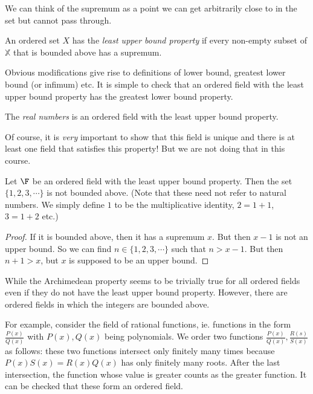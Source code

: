 \documentclass[a4paper]{article}
\begin{document}
We can think of the supremum as a point we can get arbitrarily close to in the set but cannot pass through.

\begin{defi}
  An ordered set $X$ has the \emph{least upper bound property} if every non-empty subset of $\mathbb{X}$ that is bounded above has a supremum.
\end{defi}

Obvious modifications give rise to definitions of lower bound, greatest lower bound (or infimum) etc. It is simple to check that an ordered field with the least upper bound property has the greatest lower bound property.

\begin{defi}
  The \emph{real numbers} is an ordered field with the least upper bound property.
\end{defi}
Of course, it is \emph{very} important to show that this field is unique and there is at least one field that satisfies this property! But we are not doing that in this course.

\begin{lemma}
  Let $\F$ be an ordered field with the least upper bound property. Then the set $\{1, 2, 3, \cdots\}$ is not bounded above. (Note that these need not refer to natural numbers. We simply define $1$ to be the multiplicative identity, $2 = 1 + 1$, $3 = 1 + 2$ etc.)
\end{lemma}

\begin{proof}
  If it is bounded above, then it has a supremum $x$. But then $x - 1$ is not an upper bound. So we can find $n\in \{1, 2, 3, \cdots\}$ such that $n> x - 1$. But then $n + 1 > x$, but $x$ is supposed to be an upper bound.
\end{proof}

While the Archimedean property seems to be trivially true for all ordered fields even if they do not have the least upper bound property. However, there are ordered fields in which the integers are bounded above.

For example, consider the field of rational functions, ie. functions in the form $\frac{P(x)}{Q(x)}$ with $P(x), Q(x)$ being polynomials. We order two functions $\frac{P(x)}{Q(x)}, \frac{R(s)}{S(x)}$ as follows: these two functions intersect only finitely many times because $P(x)S(x) = R(x)Q(x)$ has only finitely many roots. After the last intersection, the function whose value is greater counts as the greater function. It can be checked that these form an ordered field.
\end{document}
